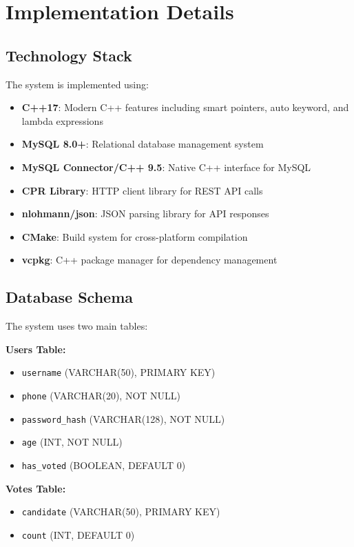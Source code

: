\documentclass[conference]{IEEEtran}
\begin{document}
\section{Implementation Details}

\subsection{Technology Stack}
The system is implemented using:
\begin{itemize}
    \item \textbf{C++17}: Modern C++ features including smart pointers, auto keyword, and lambda expressions
    \item \textbf{MySQL 8.0+}: Relational database management system
    \item \textbf{MySQL Connector/C++ 9.5}: Native C++ interface for MySQL
    \item \textbf{CPR Library}: HTTP client library for REST API calls
    \item \textbf{nlohmann/json}: JSON parsing library for API responses
    \item \textbf{CMake}: Build system for cross-platform compilation
    \item \textbf{vcpkg}: C++ package manager for dependency management
\end{itemize}

\subsection{Database Schema}
The system uses two main tables:

\textbf{Users Table:}
\begin{itemize}
    \item \texttt{username} (VARCHAR(50), PRIMARY KEY)
    \item \texttt{phone} (VARCHAR(20), NOT NULL)
    \item \texttt{password\_hash} (VARCHAR(128), NOT NULL)
    \item \texttt{age} (INT, NOT NULL)
    \item \texttt{has\_voted} (BOOLEAN, DEFAULT 0)
\end{itemize}

\textbf{Votes Table:}
\begin{itemize}
    \item \texttt{candidate} (VARCHAR(50), PRIMARY KEY)
    \item \texttt{count} (INT, DEFAULT 0)
\end{itemize}
\end{document}
